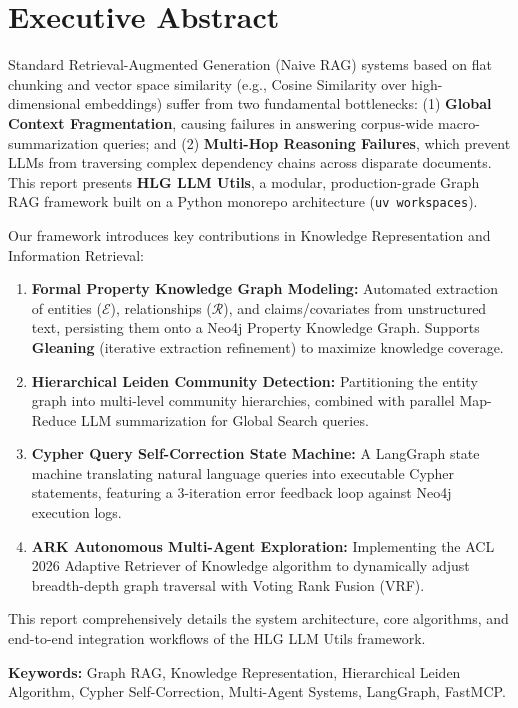 \documentclass[11pt,a4paper]{report}
\begin{document}
\section*{Executive Abstract}

Standard Retrieval-Augmented Generation (Naive RAG) systems based on flat chunking and vector space similarity (e.g., Cosine Similarity over high-dimensional embeddings) suffer from two fundamental bottlenecks: (1) \textbf{Global Context Fragmentation}, causing failures in answering corpus-wide macro-summarization queries; and (2) \textbf{Multi-Hop Reasoning Failures}, which prevent LLMs from traversing complex dependency chains across disparate documents. This report presents \textbf{HLG LLM Utils}, a modular, production-grade Graph RAG framework built on a Python monorepo architecture (\texttt{uv workspaces}).

Our framework introduces key contributions in Knowledge Representation and Information Retrieval:
\begin{enumerate}[leftmargin=*]
    \item \textbf{Formal Property Knowledge Graph Modeling:} Automated extraction of entities ($\mathcal{E}$), relationships ($\mathcal{R}$), and claims/covariates from unstructured text, persisting them onto a Neo4j Property Knowledge Graph. Supports \textbf{Gleaning} (iterative extraction refinement) to maximize knowledge coverage.
    \item \textbf{Hierarchical Leiden Community Detection:} Partitioning the entity graph into multi-level community hierarchies, combined with parallel Map-Reduce LLM summarization for Global Search queries.
    \item \textbf{Cypher Query Self-Correction State Machine:} A LangGraph state machine translating natural language queries into executable Cypher statements, featuring a 3-iteration error feedback loop against Neo4j execution logs.
    \item \textbf{ARK Autonomous Multi-Agent Exploration:} Implementing the ACL 2026 Adaptive Retriever of Knowledge algorithm to dynamically adjust breadth-depth graph traversal with Voting Rank Fusion (VRF).
\end{enumerate}

This report comprehensively details the system architecture, core algorithms, and end-to-end integration workflows of the HLG LLM Utils framework.

\textbf{Keywords:} Graph RAG, Knowledge Representation, Hierarchical Leiden Algorithm, Cypher Self-Correction, Multi-Agent Systems, LangGraph, FastMCP.
\end{document}
